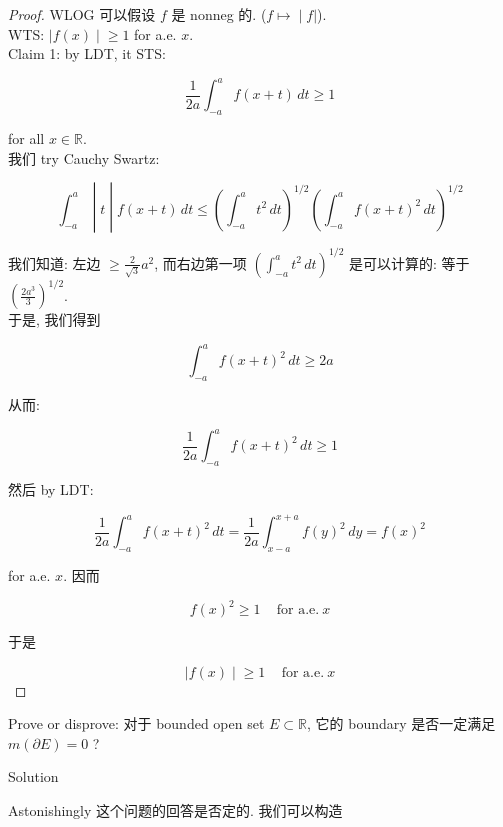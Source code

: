 \documentclass{qlnotes-export}
\begin{document}
\begin{proof}

WLOG 可以假设 \(f\) 是 nonneg 的. (\(\left. f\mapsto \middle| f| \right.\)).\\
WTS: \(\left. |f(x) \middle| \geq 1 \right.\) for a.e. \(x\).\\
Claim 1: by LDT, it STS:

\[\frac{1}{2a}\int_{- a}^{a}f(x + t)\, dt \geq 1\]

for all \(x \in {\mathbb{R}}\).\\
我们 try Cauchy Swartz:

\[\left. \int_{- a}^{a} \middle| t \middle| f(x + t)\, dt \leq (\int_{- a}^{a}t^{2}\, dt)^{1/2}(\int_{- a}^{a}f(x + t)^{2}\, dt)^{1/2} \right.\]

我们知道: 左边 \(\geq \frac{2}{\sqrt{3}}a^{2}\), 而右边第一项 \((\int_{- a}^{a}t^{2}\, dt)^{1/2}\) 是可以计算的: 等于 \((\frac{2a^{3}}{3})^{1/2}\).\\
于是, 我们得到

\[\int_{- a}^{a}f(x + t)^{2}\, dt \geq 2a\]

从而:

\[\frac{1}{2a}\int_{- a}^{a}f(x + t)^{2}\, dt \geq 1\]

然后 by LDT:

\[\frac{1}{2a}\int_{- a}^{a}f(x + t)^{2}\, dt = \frac{1}{2a}\int_{x - a}^{x + a}f(y)^{2}\, dy = f(x)^{2}\]

for a.e. \(x\). 因而

\[f(x)^{2} \geq 1\,\quad\text{for a.e.}\ x\]

于是

\[\left. |f(x) \middle| \geq 1\,\quad\text{for a.e.}\ x \right.\]

\end{proof}

\begin{example}\label{ex-lec37-problem-solving-iii-example-002}

Prove or disprove: 对于 bounded open set \(E \subset {\mathbb{R}}\), 它的 boundary 是否一定满足 \(m(\partial E) = 0\) ?\\

\end{example}

\begin{qlsolution}{Solution}

Astonishingly 这个问题的回答是否定的. 我们可以构造

\end{qlsolution}
\end{document}
